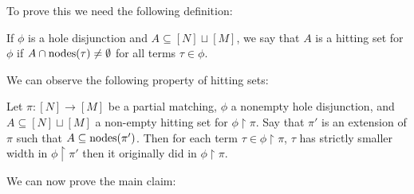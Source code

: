 To prove this we need the following definition:
\begin{definition}
If $\phi$ is a hole disjunction and $A \subseteq [N] \sqcup [M]$, we say that $A$ is a hitting set for $\phi$ if $A \cap \mathrm{nodes}(\tau)  \neq \emptyset$ for all terms $\tau \in \phi$. 
\end{definition}
We can observe the following property of hitting sets:
\begin{observation}\label{obs:width-killing}
Let $\pi: [N] \to [M]$ be a partial matching, $\phi$ a nonempty hole disjunction, and $A\subseteq [N] \sqcup [M]$ a non-empty hitting set for $\phi\upharpoonright\pi$.  Say that $\pi'$ is an extension of $\pi$ such that $A \subseteq \mathrm{nodes}(\pi')$. Then for each term $\tau \in \phi\upharpoonright\pi$, $\tau$ has strictly smaller width in $\phi\upharpoonright\pi'$ then it originally did in $\phi\upharpoonright\pi$. 
\end{observation}
We can now prove the main claim:
